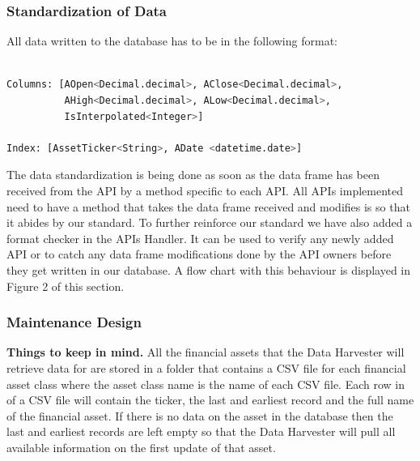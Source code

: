 \documentclass[main.tex]{subfiles}
\begin{document}
\subsubsection{Standardization of Data}
All data written to the database has to be in the following format:
\begin{lstlisting}[language=Python, caption= Pandas Data Frame Format , label=lst:Development_env]

Columns: [AOpen<Decimal.decimal>, AClose<Decimal.decimal>,
          AHigh<Decimal.decimal>, ALow<Decimal.decimal>,
          IsInterpolated<Integer>] 
          
Index: [AssetTicker<String>, ADate <datetime.date>]
\end{lstlisting}

The data standardization is being done as soon as the data frame has been received from the API by a method specific to each API. All APIs implemented need to have a method that takes the data frame received and modifies is so that it abides by our standard. To further reinforce our standard we have also added a format checker in the APIs Handler. It can be used to verify any newly added API or to catch any data frame modifications done by the API owners before they get written in our database.  A flow chart with this behaviour is displayed in Figure 2 of this section. 


\subsubsection{Maintenance Design}
\textbf{Things to keep in mind.\newline}
All the financial assets that the Data Harvester will retrieve data for are stored in a folder that contains a CSV file for each financial asset class where the asset class name is the name of each CSV file. Each row in of a CSV file will contain the ticker, the last and earliest record and the full name of the financial asset. If there is no data on the asset in the database then the last and earliest records are left empty so that the Data Harvester will pull all available information on the first update of that asset.\newline
\end{document}
